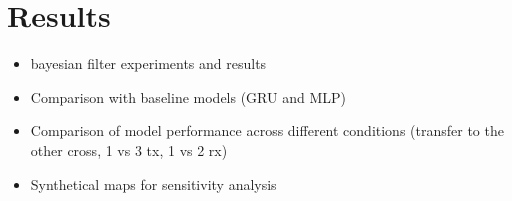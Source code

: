 \chapter{Results}
\begin{itemize}
\item bayesian filter experiments and results
\item Comparison with baseline models (GRU and MLP)
\item Comparison of model performance across different conditions (transfer to the other cross, 1 vs 3 tx, 1 vs 2 rx)
\item Synthetical maps for sensitivity analysis
\end{itemize}
